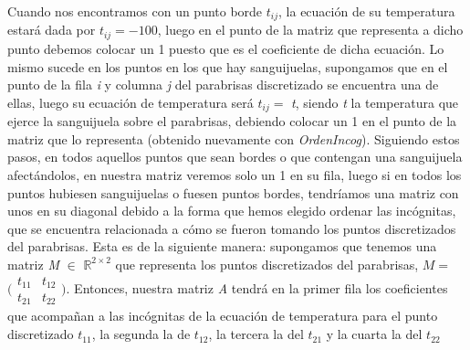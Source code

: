 \documentclass[10pt, a4paper]{article}
\begin{document}
   Cuando nos encontramos con un punto borde $t_{ij}$, la ecuaci\'on de su temperatura estar\'a dada por $t_{ij}=-100$, luego en el punto de la matriz que representa a dicho punto debemos colocar un 1 puesto que es el coeficiente de dicha ecuaci\'on.  Lo mismo sucede en los puntos en los que hay sanguijuelas, supongamos que en el punto de la fila \textit{i} y columna \textit{j} del parabrisas discretizado se encuentra una de ellas, luego su ecuaci\'on de temperatura ser\'a $t_{ij}=$ \textit{t}, siendo \textit{t} la temperatura que ejerce la sanguijuela sobre el parabrisas, debiendo colocar un 1 en el punto de la matriz que lo representa (obtenido nuevamente con \textit{OrdenIncog}). Siguiendo estos pasos, en todos aquellos puntos que sean bordes o que contengan una sanguijuela afect\'andolos, en nuestra matriz veremos solo un 1 en su fila, luego si en todos los puntos hubiesen sanguijuelas o fuesen puntos bordes, tendr\'iamos una matriz con unos en su diagonal debido a la forma que hemos elegido ordenar las inc\'ognitas, que se encuentra relacionada a c\'omo se fueron tomando los puntos discretizados del parabrisas. Esta es de la siguiente manera: supongamos que tenemos una matriz \textit{M} $\in$ $\mathbb{R}^{2\times 2}$ que representa los puntos discretizados del parabrisas, $M=$
$\bigl(\begin{smallmatrix}
t_{11}&t_{12}\\ t_{21}&t_{22}
\end{smallmatrix} \bigr)$. Entonces, nuestra matriz \textit{A} tendr\'a en la primer fila los coeficientes que acompañan a las inc\'ognitas de la ecuaci\'on de temperatura para el punto discretizado $t_{11}$, la segunda la de $t_{12}$, la tercera la del $t_{21}$ y la cuarta la del $t_{22}$
\end{document}
